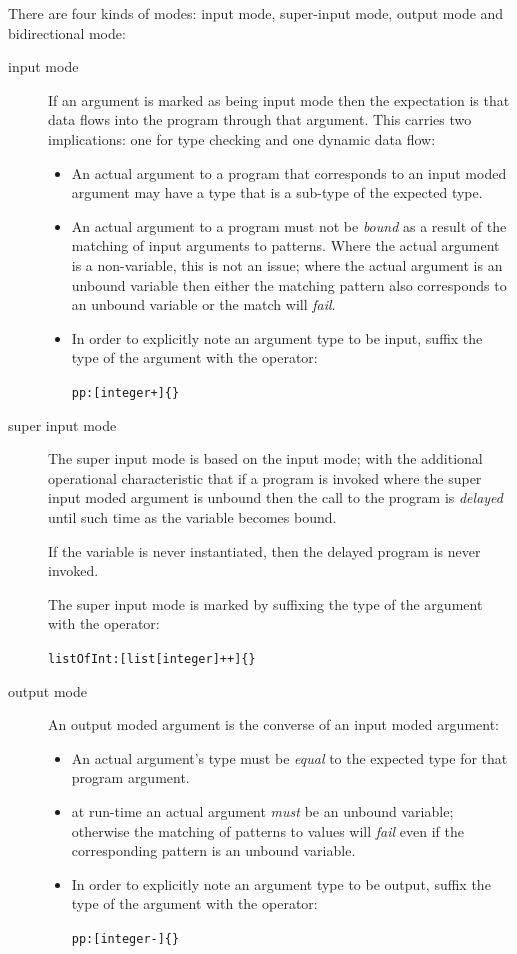 There are four kinds of modes: input mode, super-input mode, output mode and bidirectional mode:
\begin{description}
\item[input mode]
If an argument is marked as being input mode then the expectation is that data flows into the program through that argument. This carries two implications: one for type checking and one dynamic data flow:
\begin{itemize}
\item
An actual argument to a program that corresponds to an input moded argument may have a type that is a sub-type of the expected type.
\item
An actual argument to a program must not be \emph{bound} as a result of the matching of input arguments to patterns. Where the actual argument is a non-variable, this is not an issue; where the actual argument is an unbound variable then either the matching pattern also corresponds to an unbound variable or the match will \emph{fail}.
\item
In order to explicitly note an argument type to be input, suffix the type of the argument with the \q{+} operator:
\begin{alltt}
pp:[integer+]\{\}
\end{alltt}
\end{itemize}

\item[super input mode]
The super input mode is based on the input mode; with the additional operational characteristic that if a program is invoked where the super input moded argument is unbound then the call to the program is \emph{delayed} until such time as the variable becomes bound.

If the variable is never instantiated, then the delayed program is never invoked.

The super input mode is marked by suffixing the type of the argument with the \q{++} operator:
\begin{alltt}
listOfInt:[list[integer]++]\{\}
\end{alltt}

\item[output mode]
An output moded argument is the converse of an input moded argument:
\begin{itemize}
\item An actual argument's type must be \emph{equal} to the expected type for that program argument.
\item at run-time an actual argument \emph{must} be an unbound variable; otherwise the matching of patterns to values will \emph{fail} even if the corresponding pattern is an unbound variable.
\item
In order to explicitly note an argument type to be output, suffix the type of the argument with the \q{-} operator:
\begin{alltt}
pp:[integer-]\{\}
\end{alltt}
\end{itemize}


\end{description}
